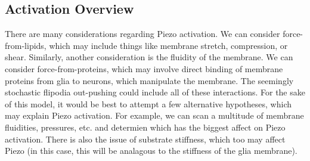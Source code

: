 \documentclass[12pt]{amsart}
\begin{document}
\subsection{Activation Overview} There are many considerations regarding Piezo activation. We can consider force-from-lipids, which may include things like membrane stretch, compression, or shear. Similarly, another consideration is the fluidity of the membrane. We can consider force-from-proteins, which may involve direct binding of membrane proteins from glia to neurons, which manipulate the membrane. The seemingly stochastic flipodia out-pushing could include all of these interactions. For the sake of this model, it would be best to attempt a few alternative hypotheses, which may explain Piezo activation. For example, we can scan a multitude of membrane fluidities, pressures, etc. and determien which has the biggest affect on Piezo activation. There is also the issue of substrate stiffness, which too may affect Piezo (in this case, this will be analagous to the stiffness of the glia membrane).\newline 
\end{document}
